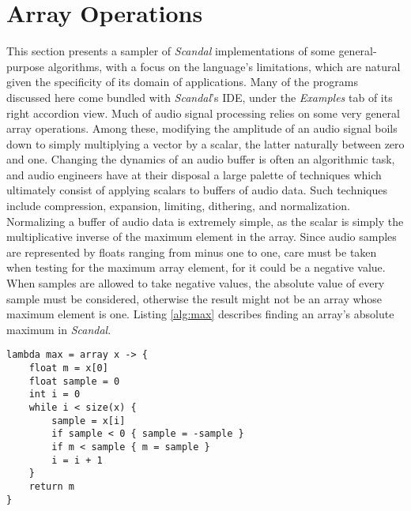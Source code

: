\section{Array Operations}

This section presents a sampler of \emph{Scandal} implementations of some general-purpose algorithms, with a focus on the language's limitations, which are natural given the specificity of its domain of applications. Many of the programs discussed here come bundled with \emph{Scandal}'s IDE, under the \emph{Examples} tab of its right accordion view. Much of audio signal processing relies on some very general array operations. Among these, modifying the amplitude of an audio signal boils down to simply multiplying a vector by a scalar, the latter naturally between zero and one. Changing the dynamics of an audio buffer is often an algorithmic task, and audio engineers have at their disposal a large palette of techniques which ultimately consist of applying scalars to buffers of audio data. Such techniques include compression, expansion, limiting, dithering, and normalization. Normalizing a buffer of audio data is extremely simple, as the scalar is simply the multiplicative inverse of the maximum element in the array. Since audio samples are represented by floats ranging from minus one to one, care must be taken when testing for the maximum array element, for it could be a negative value. When samples are allowed to take negative values, the absolute value of every sample must be considered, otherwise the result might not be an array whose maximum element is one. Listing \ref{alg:max} describes finding an array's absolute maximum in \emph{Scandal}.

\begin{lstlisting}[emph={lambda,array,float,int,while,size,if,return},emphstyle={\textbf},caption={Computing the maximum element of an array.},label={alg:max}]
lambda max = array x -> {
	float m = x[0]
	float sample = 0
	int i = 0
	while i < size(x) {
		sample = x[i]
		if sample < 0 { sample = -sample }
		if m < sample { m = sample }
		i = i + 1
	}
	return m
}
\end{lstlisting}


